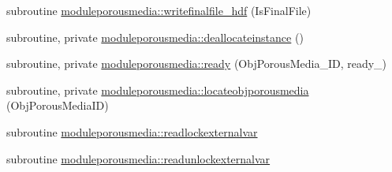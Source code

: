 \begin{DoxyCompactItemize}
\item 
subroutine \mbox{\hyperlink{namespacemoduleporousmedia_aa65138badcf5c2f27aad4149d87bcd10}{moduleporousmedia\+::writefinalfile\+\_\+hdf}} (Is\+Final\+File)
\item 
subroutine, private \mbox{\hyperlink{namespacemoduleporousmedia_a7941341d1b0822b150125db812b3fc76}{moduleporousmedia\+::deallocateinstance}} ()
\item 
subroutine, private \mbox{\hyperlink{namespacemoduleporousmedia_a9773f71db5ddd0e9b7ddeac94fc33e39}{moduleporousmedia\+::ready}} (Obj\+Porous\+Media\+\_\+\+ID, ready\+\_\+)
\item 
subroutine, private \mbox{\hyperlink{namespacemoduleporousmedia_ac6ac9e34fbd80443bbf33b5006e8b25e}{moduleporousmedia\+::locateobjporousmedia}} (Obj\+Porous\+Media\+ID)
\item 
subroutine \mbox{\hyperlink{namespacemoduleporousmedia_acfd0df7c0db51fe2a9c3ab697d07b548}{moduleporousmedia\+::readlockexternalvar}}
\item 
subroutine \mbox{\hyperlink{namespacemoduleporousmedia_ade70c21b16e6288bf0e789900f845c5a}{moduleporousmedia\+::readunlockexternalvar}}
\end{DoxyCompactItemize}
